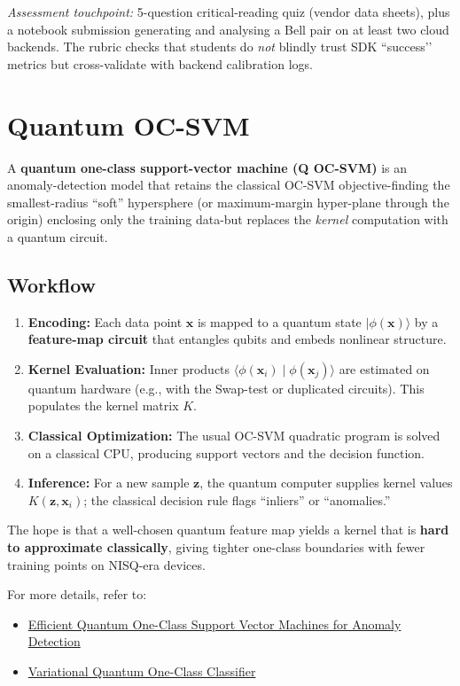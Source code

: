 \documentclass[11pt,a4paper]{article}
\begin{document}
\vspace{0.5em}
\noindent\emph{Assessment touchpoint:} 5-question critical-reading quiz (vendor data sheets), plus a notebook submission generating and analysing a Bell pair on at least two cloud backends.  The rubric checks that students do \emph{not} blindly trust SDK ``success’’ metrics but cross-validate with backend calibration logs.

\section{Quantum OC-SVM}

	A \textbf{quantum one-class support-vector machine (Q OC-SVM)} is an anomaly-detection model that retains the classical OC-SVM objective-finding the smallest-radius “soft” hypersphere (or maximum-margin hyper-plane through the origin) enclosing only the training data-but replaces the \emph{kernel} computation with a quantum circuit.
	
	\subsection{Workflow}
	\begin{enumerate}
		\item \textbf{Encoding:} Each data point $\mathbf{x}$ is mapped to a quantum state $\lvert \phi(\mathbf{x})\rangle$ by a \textbf{feature-map circuit} that entangles qubits and embeds nonlinear structure.
		\item \textbf{Kernel Evaluation:} Inner products $\langle \phi(\mathbf{x}_i) \mid \phi(\mathbf{x}_j) \rangle$ are estimated on quantum hardware (e.g., with the Swap-test or duplicated circuits). This populates the kernel matrix $K$.
		\item \textbf{Classical Optimization:} The usual OC-SVM quadratic program is solved on a classical CPU, producing support vectors and the decision function.
		\item \textbf{Inference:} For a new sample $\mathbf{z}$, the quantum computer supplies kernel values $K(\mathbf{z}, \mathbf{x}_i)$; the classical decision rule flags “inliers” or “anomalies.”
	\end{enumerate}
	
	The hope is that a well-chosen quantum feature map yields a kernel that is \textbf{hard to approximate classically}, giving tighter one-class boundaries with fewer training points on NISQ-era devices.
	
	For more details, refer to:
	\begin{itemize}
		\item \href{https://arxiv.org/abs/2407.20753}{Efficient Quantum One-Class Support Vector Machines for Anomaly Detection}
		\item \href{https://arxiv.org/abs/2210.02674}{Variational Quantum One-Class Classifier}
	\end{itemize}
	
\end{document}
